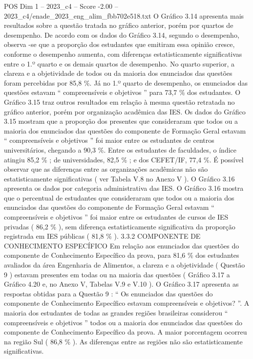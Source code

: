 \begin{textsample}{POS Dim 1 – 2023\_c4 – Score -2.00 – 2023\_c4/enade\_2023\_eng\_alim\_fbb702e518.txt}
O Gráfico 3.14 apresenta mais resultados sobre a questão tratada no gráfico anterior, porém por quartos de desempenho.
De acordo com os dados do Gráfico 3.14, segundo o desempenho, observa -se que a proporção dos estudantes que emitiram essa opinião cresce, conforme o desempenho aumenta, com diferenças estatisticamente significativas entre o 1.º quarto e os demais quartos de desempenho.
No quarto superior, a clareza e a objetividade de todos ou da maioria dos enunciados das questões foram percebidas por 85,8 \%.
Já no 1.º quarto de desempenho, os enunciados das questões estavam “ compreensíveis e objetivos ” para 73,7 \% dos estudantes.
O Gráfico 3.15 traz outros resultados em relação à mesma questão retratada no gráfico anterior, porém por organização acadêmica das IES.
Os dados do Gráfico 3.15 mostram que a proporção dos presentes que consideraram que todos ou a maioria dos enunciados das questões do componente de Formação Geral estavam “ compreensíveis e objetivos ” foi maior entre os estudantes de centros universitários, chegando a 90,3 \%.
Entre os estudantes de faculdades, o índice atingiu 85,2 \% ; de universidades, 82,5 \% ; e dos CEFET/IF, 77,4 \%.
É possível observar que as diferenças entre as organizações acadêmicas não são estatisticamente significativas ( ver Tabela V.8 no Anexo V ).
O Gráfico 3.16 apresenta os dados por categoria administrativa das IES.
O Gráfico 3.16 mostra que o percentual de estudantes que consideraram que todos ou a maioria dos enunciados das questões do componente de Formação Geral estavam “ compreensíveis e objetivos ” foi maior entre os estudantes de cursos de IES privadas ( 86,2 \% ), sem diferença estatisticamente significativa da proporção registrada em IES públicas ( 81,8 \% ). 3.3.2 COMPONENTE DE CONHECIMENTO ESPECÍFICO Em relação aos enunciados das questões do componente de Conhecimento Específico da prova, para 81,6 \% dos estudantes avaliados da área Engenharia de Alimentos, a clareza e a objetividade ( Questão 9 ) estavam presentes em todas ou na maioria das questões ( Gráfico 3.17 a Gráfico 4.20 e, no Anexo V, Tabelas V.9 e V.10 ).
O Gráfico 3.17 apresenta as respostas obtidas para a Questão 9 : “ Os enunciados das questões do componente de Conhecimento Específico estavam compreensíveis e objetivos? ”.
A maioria dos estudantes de todas as grandes regiões brasileiras considerou “ compreensíveis e objetivos ” todos ou a maioria dos enunciados das questões do componente de Conhecimento Específico da prova.
A maior porcentagem ocorreu na região Sul ( 86,8 \% ).
As diferenças entre as regiões não são estatisticamente significativas.

\end{textsample}
